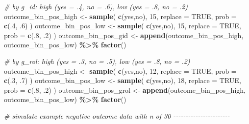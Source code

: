 \documentclass[
]{book}
\newenvironment{Shaded}{\begin{snugshade}}{\end{snugshade}}
\newcommand{\AttributeTok}[1]{\textcolor[rgb]{0.13,0.29,0.53}{#1}}
\newcommand{\CommentTok}[1]{\textcolor[rgb]{0.56,0.35,0.01}{\textit{#1}}}
\newcommand{\ConstantTok}[1]{\textcolor[rgb]{0.56,0.35,0.01}{#1}}
\newcommand{\DecValTok}[1]{\textcolor[rgb]{0.00,0.00,0.81}{#1}}
\newcommand{\FunctionTok}[1]{\textcolor[rgb]{0.13,0.29,0.53}{\textbf{#1}}}
\newcommand{\NormalTok}[1]{#1}
\newcommand{\OtherTok}[1]{\textcolor[rgb]{0.56,0.35,0.01}{#1}}
\newcommand{\SpecialCharTok}[1]{\textcolor[rgb]{0.81,0.36,0.00}{\textbf{#1}}}
\newcommand{\StringTok}[1]{\textcolor[rgb]{0.31,0.60,0.02}{#1}}
\begin{document}
\begin{Shaded}
\begin{Highlighting}[]
\CommentTok{\# by g\_id: high (yes = .4, no = .6), low (yes = .8, no = .2)}
\NormalTok{outcome\_bin\_pos\_high }\OtherTok{\textless{}{-}} \FunctionTok{sample}\NormalTok{(}
  \FunctionTok{c}\NormalTok{(}\StringTok{\textquotesingle{}yes\textquotesingle{}}\NormalTok{,}\StringTok{\textquotesingle{}no\textquotesingle{}}\NormalTok{), }\DecValTok{15}\NormalTok{, }\AttributeTok{replace =} \ConstantTok{TRUE}\NormalTok{, }\AttributeTok{prob =} \FunctionTok{c}\NormalTok{(.}\DecValTok{4}\NormalTok{, .}\DecValTok{6}\NormalTok{)}
\NormalTok{)}
\NormalTok{outcome\_bin\_pos\_low }\OtherTok{\textless{}{-}} \FunctionTok{sample}\NormalTok{(}
  \FunctionTok{c}\NormalTok{(}\StringTok{\textquotesingle{}yes\textquotesingle{}}\NormalTok{,}\StringTok{\textquotesingle{}no\textquotesingle{}}\NormalTok{), }\DecValTok{15}\NormalTok{, }\AttributeTok{replace =} \ConstantTok{TRUE}\NormalTok{, }\AttributeTok{prob =} \FunctionTok{c}\NormalTok{(.}\DecValTok{8}\NormalTok{, .}\DecValTok{2}\NormalTok{)}
\NormalTok{)}
\NormalTok{outcome\_bin\_pos\_gid }\OtherTok{\textless{}{-}} \FunctionTok{append}\NormalTok{(outcome\_bin\_pos\_high, outcome\_bin\_pos\_low) }\SpecialCharTok{\%\textgreater{}\%}
  \FunctionTok{factor}\NormalTok{()}


\CommentTok{\# by g\_rol: high (yes = .3, no = .5), low (yes = .8, no = .2)}
\NormalTok{outcome\_bin\_pos\_high }\OtherTok{\textless{}{-}} \FunctionTok{sample}\NormalTok{(}
  \FunctionTok{c}\NormalTok{(}\StringTok{\textquotesingle{}yes\textquotesingle{}}\NormalTok{,}\StringTok{\textquotesingle{}no\textquotesingle{}}\NormalTok{), }\DecValTok{12}\NormalTok{, }\AttributeTok{replace =} \ConstantTok{TRUE}\NormalTok{, }\AttributeTok{prob =} \FunctionTok{c}\NormalTok{(.}\DecValTok{3}\NormalTok{, .}\DecValTok{7}\NormalTok{)}
\NormalTok{)}
\NormalTok{outcome\_bin\_pos\_low }\OtherTok{\textless{}{-}} \FunctionTok{sample}\NormalTok{(}
  \FunctionTok{c}\NormalTok{(}\StringTok{\textquotesingle{}yes\textquotesingle{}}\NormalTok{,}\StringTok{\textquotesingle{}no\textquotesingle{}}\NormalTok{), }\DecValTok{18}\NormalTok{, }\AttributeTok{replace =} \ConstantTok{TRUE}\NormalTok{, }\AttributeTok{prob =} \FunctionTok{c}\NormalTok{(.}\DecValTok{8}\NormalTok{, .}\DecValTok{2}\NormalTok{)}
\NormalTok{)}
\NormalTok{outcome\_bin\_pos\_grol }\OtherTok{\textless{}{-}} \FunctionTok{append}\NormalTok{(outcome\_bin\_pos\_high, outcome\_bin\_pos\_low) }\SpecialCharTok{\%\textgreater{}\%}
  \FunctionTok{factor}\NormalTok{()}


\CommentTok{\# simulate example negative outcome data with n of 30 {-}{-}{-}{-}{-}{-}{-}{-}{-}{-}{-}{-}{-}{-}{-}{-}{-}{-}{-}{-}{-}{-}{-}}


\end{Highlighting}
\end{Shaded}
\end{document}
